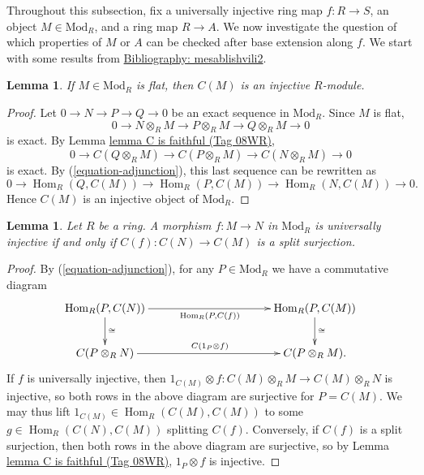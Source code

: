 \documentclass{amsart}
\theoremstyle{plain}
\newtheorem{lemma}[subsection]{Lemma}
\theoremstyle{definition}
\theoremstyle{remark}
\numberwithin{equation}{subsection}
\def\Hom{\mathop{\mathrm{Hom}}\nolimits}
\begin{document}
Throughout this subsection, fix a universally injective ring map $f : R \to S$,
an object $M \in \text{Mod}_R$, and a ring map $R \to A$. We now investigate
the question of which properties of $M$ or $A$ can be checked after base
extension along $f$. We start with some results from 
\href{https://stacks.math.columbia.edu/bibliography}{Bibliography: mesablishvili2}.


\begin{lemma}
\label{lemma-flat-to-injective}
If $M \in \text{Mod}_R$ is flat, then $C(M)$ is an injective $R$-module.
\end{lemma}

\begin{proof}
Let $0 \to N \to P \to Q \to 0$ be an exact sequence in $\text{Mod}_R$. Since 
$M$ is flat,
$$
0 \to N \otimes_R M \to P \otimes_R M \to Q \otimes_R M \to 0
$$
is exact.
By Lemma \href{https://stacks.math.columbia.edu/tag/08WR}{lemma C is faithful (Tag 08WR)},
$$
0 \to C(Q \otimes_R M) \to C(P \otimes_R M) \to C(N \otimes_R M) \to 0
$$
is exact. By (\ref{equation-adjunction}), this last sequence can be rewritten
as
$$
0 \to \Hom_R(Q, C(M)) \to \Hom_R(P, C(M)) \to \Hom_R(N, C(M)) \to 0.
$$
Hence $C(M)$ is an injective object of $\text{Mod}_R$.
\end{proof}


\begin{lemma}
\label{lemma-split-surjection}
Let $R$ be a ring. A morphism $f: M \to N$ in $\text{Mod}_R$ is universally
injective if and only if $C(f): C(N) \to C(M)$ is a split surjection.
\end{lemma}

\begin{proof}
By (\ref{equation-adjunction}), for any $P \in \text{Mod}_R$ we have a 
commutative diagram
$$
\xymatrix@C=9pc{
\Hom_R( P, C(N)) \ar[r]_{\Hom_R(P,C(f))} \ar[d]^{\cong} &
\Hom_R(P,C(M)) \ar[d]^{\cong} \\
C(P \otimes_R N ) \ar[r]^{C(1_{P} \otimes f)} & C(P \otimes_R M ).
}
$$
If $f$ is universally injective, then $1_{C(M)} \otimes f: C(M) \otimes_R M \to 
C(M) \otimes_R N$ is injective,
so both rows in the above diagram are surjective for $P = C(M)$. We may thus 
lift
$1_{C(M)} \in \Hom_R(C(M), C(M))$ to some $g \in \Hom_R(C(N), C(M))$ splitting 
$C(f)$.
Conversely, if $C(f)$ is a split surjection, then 
both rows in the above diagram are surjective,
so by Lemma \href{https://stacks.math.columbia.edu/tag/08WR}{lemma C is faithful (Tag 08WR)}, $1_{P} \otimes f$ is injective.
\end{proof}
\end{document}

